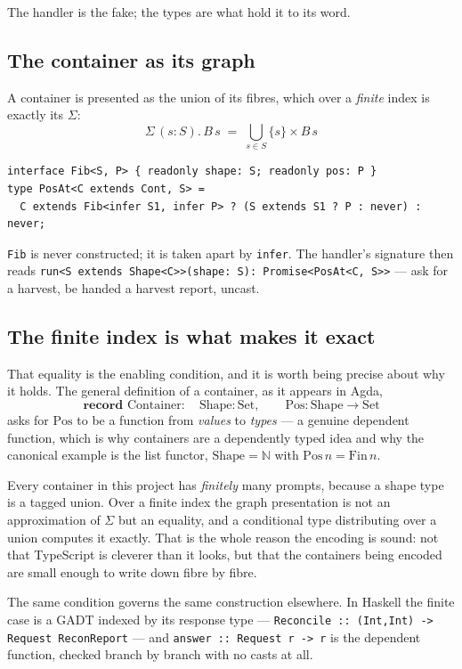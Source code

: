 \documentclass[11pt,a4paper]{article}
\begin{document}
The handler is the fake; the types are what hold it to its word.

\subsection*{The container as its graph}

A container is presented as the union of its fibres, which over a
\emph{finite} index is exactly its $\Sigma$:
\[
  \Sigma\,(s : S).\,B\,s \;=\; \bigcup_{s \in S} \{s\} \times B\,s
\]

\begin{lstlisting}
interface Fib<S, P> { readonly shape: S; readonly pos: P }
type PosAt<C extends Cont, S> =
  C extends Fib<infer S1, infer P> ? (S extends S1 ? P : never) : never;
\end{lstlisting}

\noindent \texttt{Fib} is never constructed; it is taken apart by \texttt{infer}.
The handler's signature then reads \texttt{run<S extends Shape<C>>(shape: S):
Promise<PosAt<C, S>>} --- ask for a harvest, be handed a harvest report, uncast.

\subsection*{The finite index is what makes it exact}

That equality is the enabling condition, and it is worth being precise about
why it holds. The general definition of a container, as it appears in Agda,
\[
  \textbf{record } \mathrm{Container} : \quad
  \mathrm{Shape} : \mathrm{Set}, \qquad
  \mathrm{Pos} : \mathrm{Shape} \to \mathrm{Set}
\]
asks for $\mathrm{Pos}$ to be a function from \emph{values} to \emph{types} ---
a genuine dependent function, which is why containers are a dependently typed
idea and why the canonical example is the list functor, $\mathrm{Shape} =
\mathbb{N}$ with $\mathrm{Pos}\,n = \mathrm{Fin}\,n$.

Every container in this project has \emph{finitely} many prompts, because a
shape type is a tagged union. Over a finite index the graph presentation is not
an approximation of $\Sigma$ but an equality, and a conditional type
distributing over a union computes it exactly. That is the whole reason the
encoding is sound: not that TypeScript is cleverer than it looks, but that the
containers being encoded are small enough to write down fibre by fibre.

The same condition governs the same construction elsewhere. In Haskell the
finite case is a GADT indexed by its response type --- \texttt{Reconcile ::
(Int,Int) -> Request ReconReport} --- and \texttt{answer :: Request r -> r} is
the dependent function, checked branch by branch with no casts at all.
\end{document}
